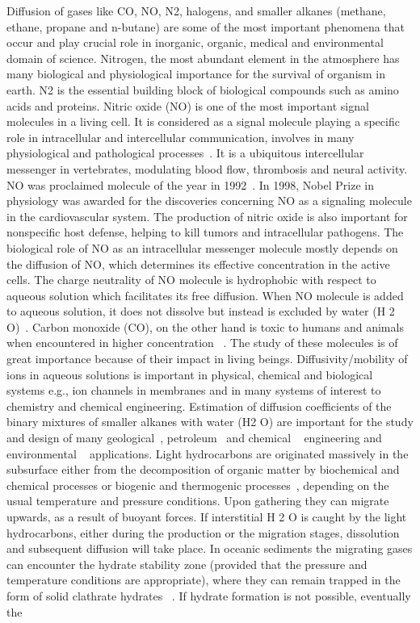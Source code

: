 \begin{sloppypar}
 Diffusion of gases like  CO, NO, N2, halogens, and smaller alkanes (methane, ethane, propane and n-butane)  are some of the most important phenomena that occur and play crucial role in inorganic, organic, medical and environmental domain of science. Nitrogen, the most abundant element in the atmosphere has many biological and physiological importance for the survival of organism in earth. N2 is the essential building block of biological compounds such as amino acids and proteins. Nitric oxide (NO) is one of the most important signal molecules in a living cell. It is considered as a signal molecule playing a specific role in intracellular and intercellular communication, involves in many physiological and pathological processes~\citep{hou1999}. It is a ubiquitous intercellular messenger in vertebrates, modulating blood flow, thrombosis and neural activity. NO was proclaimed molecule of the year in 1992~\citep{culotta1992no}. In 1998, Nobel Prize in physiology was awarded for the discoveries concerning NO as a signaling molecule in the cardiovascular system. The production of nitric oxide is also important for nonspecific host defense, helping to kill tumors and intracellular pathogens. The biological role of NO as an intracellular messenger molecule mostly depends on the diffusion of NO, which determines its effective concentration in the active cells. The charge neutrality of NO molecule is hydrophobic with respect to aqueous solution which facilitates its free diffusion. When NO molecule is added to aqueous solution, it does not dissolve but instead is excluded by water (H 2 O)~\citep{zhou2005molecular}.  Carbon monoxide (CO), on the other hand is toxic to humans and animals when encountered in higher concentration ~\citep{thompson2009carbon}. The study of these molecules is of great importance because of their impact in living beings. Diffusivity/mobility of ions in aqueous solutions is important in physical, chemical and biological systems e.g., ion channels in membranes and in many systems of interest to chemistry and chemical engineering. Estimation of  diffusion coefficients of the binary mixtures of smaller alkanes with water (H2 O) are important for the study and design of many geological~\citep{dutkiewicz2003}, petroleum~\citep{montel1993, De2001}  and chemical ~\citep{pedersen2001, Pratt1995} engineering and environmental ~\citep{taylor2000} applications. Light hydrocarbons are originated massively in the subsurface either from the decomposition of organic matter by biochemical and chemical processes \citep{claypool1983} or biogenic and thermogenic processes~\citep{strkapoc2011, hinrichs2006}, depending on the usual temperature and pressure conditions. Upon gathering they can migrate upwards, as a result of buoyant forces. If interstitial H 2 O is caught by the light hydrocarbons, either during the production or the migration stages, dissolution and subsequent diffusion will take place. In oceanic sediments the  migrating gases can encounter the hydrate stability zone (provided that the pressure and temperature conditions are appropriate), where they can remain trapped in the form of solid clathrate hydrates~ \citep{ginsburg1997}. If hydrate formation is not possible, eventually the 
\end{sloppypar}
